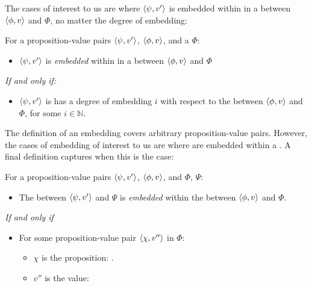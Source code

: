 \begin{note}
  The cases of interest to us are where \(\langle \psi, v' \rangle\) is embedded within in a \ros{} between \(\langle \phi, v \rangle\) and \(\Phi\), no matter the degree of embedding:

  \begin{definition}
    \label{def:embedding}
    For a proposition-value pairs \(\langle \psi, v' \rangle\), \(\langle \phi, v \rangle\), and a \pool{} \(\Phi\):


    \begin{itemize}
    \item
      \(\langle \psi, v' \rangle\) is \emph{embedded} within in a \ros{} between \(\langle \phi, v \rangle\) and \(\Phi\)
    \end{itemize}

    \emph{If and only if:}

    \begin{itemize}
    \item
      \(\langle \psi, v' \rangle\) is has a degree of embedding \(i\) with respect to the \ros{} between \(\langle \phi, v \rangle\) and \(\Phi\), for some \(i \in \mathbb{N}\).
    \end{itemize}
    \vspace{-\baselineskip}
  \end{definition}

  The definition of an embedding covers arbitrary proposition-value pairs.
  However, the cases of embedding of interest to us are where  are embedded within a \ros{}.
  A final definition captures when this is the case:

  \begin{definition}
    For a proposition-value pairs \(\langle \psi, v' \rangle\), \(\langle \phi, v \rangle\), and  \(\Phi\), \(\Psi\):

    \begin{itemize}
    \item
      The \ros{} between \(\langle \psi, v' \rangle\) and \(\Psi\) is \emph{embedded} within the \ros{} between \(\langle \phi, v \rangle\) and \(\Phi\).
    \end{itemize}

    \emph{If and only if}

    \begin{itemize}
    \item
      For some proposition-value pair \(\langle \chi, v'' \rangle\) in \(\Phi\):
      \begin{itemize}[noitemsep]
      \item
        \(\chi\) is the proposition: \Psi.
      \item
        \(v''\) is the value: 
      \end{itemize}
    \end{itemize}
    \vspace{-\baselineskip}
  \end{definition}
\end{note}

